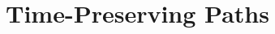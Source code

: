 \documentclass[12pt]{article}
\theoremstyle{definition}
\begin{document}











\section{Time-Preserving Paths}
\label{sec:time-pres-paths}
\end{document}

